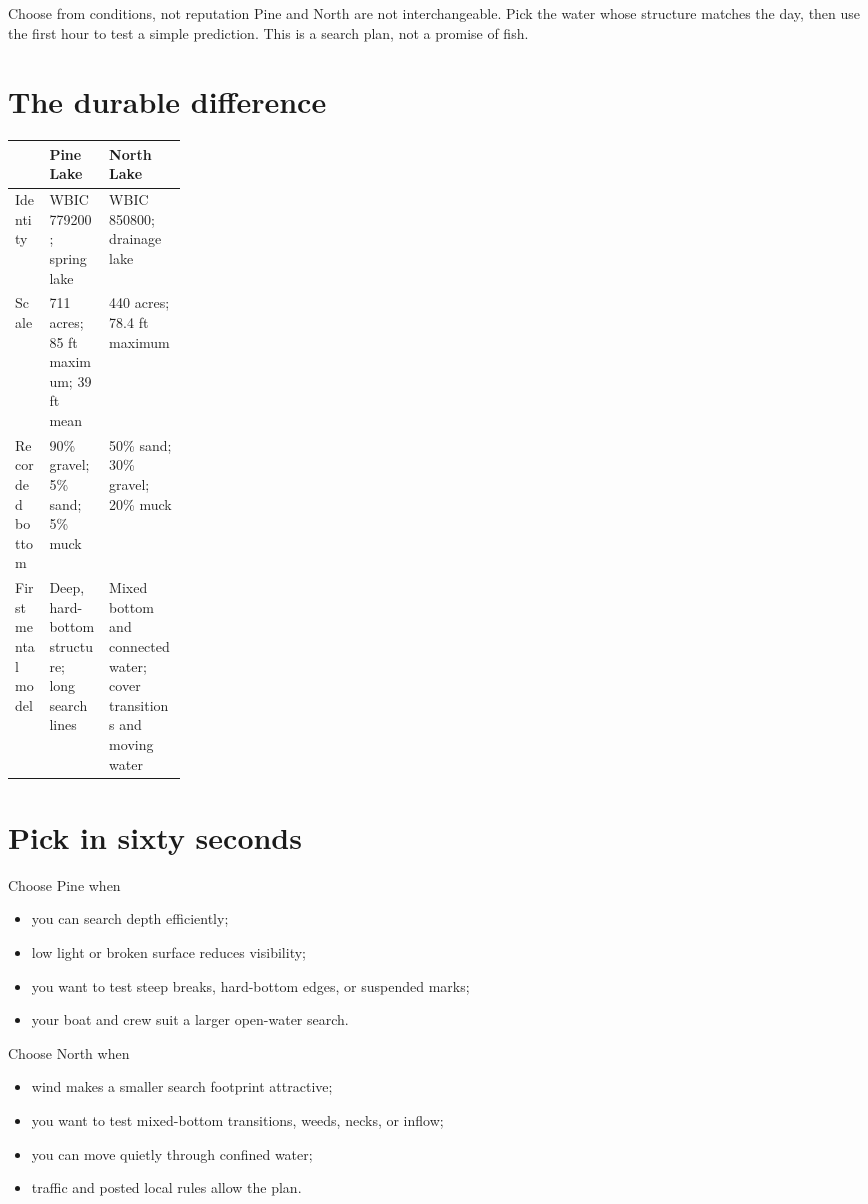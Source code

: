 

\small

\begin{telospanel}{Choose from conditions, not reputation}
Pine and North are not interchangeable. Pick the water whose structure matches
the day, then use the first hour to test a simple prediction. This is a search
plan, not a promise of fish.
\end{telospanel}

\section{The durable difference}
\begin{tabularx}{\linewidth}{@{}p{0.20\linewidth}XX@{}}
\toprule
& \textbf{Pine Lake} & \textbf{North Lake}\\
\midrule
Identity & WBIC 779200; spring lake & WBIC 850800; drainage lake\\
Scale & 711 acres; 85 ft maximum; 39 ft mean & 440 acres; 78.4 ft maximum\\
Recorded bottom & 90\% gravel; 5\% sand; 5\% muck &
50\% sand; 30\% gravel; 20\% muck\\
First mental model & Deep, hard-bottom structure; long search lines &
Mixed bottom and connected water; cover transitions and moving water\\
\bottomrule
\end{tabularx}

\section{Pick in sixty seconds}
\begin{multicols}{2}
\begin{teloscard}{Choose Pine when}
\begin{itemize}
\item you can search depth efficiently;
\item low light or broken surface reduces visibility;
\item you want to test steep breaks, hard-bottom edges, or suspended marks;
\item your boat and crew suit a larger open-water search.
\end{itemize}
\end{teloscard}
\columnbreak
\begin{teloscard}{Choose North when}
\begin{itemize}
\item wind makes a smaller search footprint attractive;
\item you want to test mixed-bottom transitions, weeds, necks, or inflow;
\item you can move quietly through confined water;
\item traffic and posted local rules allow the plan.
\end{itemize}
\end{teloscard}
\end{multicols}

